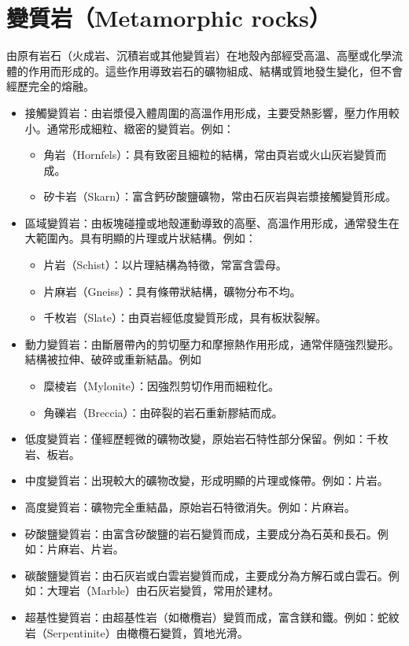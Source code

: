 \documentclass[a4paper,12pt]{report}
\begin{document}
\section{變質岩（Metamorphic rocks）}
由原有岩石（火成岩、沉積岩或其他變質岩）在地殼內部經受高溫、高壓或化學流體的作用而形成的。這些作用導致岩石的礦物組成、結構或質地發生變化，但不會經歷完全的熔融。
\begin{itemize}
\item 接觸變質岩：由岩漿侵入體周圍的高溫作用形成，主要受熱影響，壓力作用較小。通常形成細粒、緻密的變質岩。例如：
\begin{itemize}
\item 角岩（Hornfels）：具有致密且細粒的結構，常由頁岩或火山灰岩變質而成。
\item 矽卡岩（Skarn）：富含鈣矽酸鹽礦物，常由石灰岩與岩漿接觸變質形成。
\end{itemize}
\item 區域變質岩：由板塊碰撞或地殼運動導致的高壓、高溫作用形成，通常發生在大範圍內。具有明顯的片理或片狀結構。例如：
\begin{itemize}
\item 片岩（Schist）：以片理結構為特徵，常富含雲母。
\item 片麻岩（Gneiss）：具有條帶狀結構，礦物分布不均。
\item 千枚岩（Slate）：由頁岩經低度變質形成，具有板狀裂解。
\end{itemize}
\item 動力變質岩：由斷層帶內的剪切壓力和摩擦熱作用形成，通常伴隨強烈變形。結構被拉伸、破碎或重新結晶。例如
\begin{itemize}
\item 糜棱岩（Mylonite）：因強烈剪切作用而細粒化。
\item 角礫岩（Breccia）：由碎裂的岩石重新膠結而成。
\end{itemize}
\end{itemize}
\begin{itemize}
\item 低度變質岩：僅經歷輕微的礦物改變，原始岩石特性部分保留。例如：千枚岩、板岩。
\item 中度變質岩：出現較大的礦物改變，形成明顯的片理或條帶。例如：片岩。
\item 高度變質岩：礦物完全重結晶，原始岩石特徵消失。例如：片麻岩。
\end{itemize}
\begin{itemize}
\item  矽酸鹽變質岩：由富含矽酸鹽的岩石變質而成，主要成分為石英和長石。例如：片麻岩、片岩。
\item 碳酸鹽變質岩：由石灰岩或白雲岩變質而成，主要成分為方解石或白雲石。例如：大理岩（Marble）由石灰岩變質，常用於建材。
\item 超基性變質岩：由超基性岩（如橄欖岩）變質而成，富含鎂和鐵。例如：蛇紋岩（Serpentinite）由橄欖石變質，質地光滑。
\end{itemize}
\end{document}
